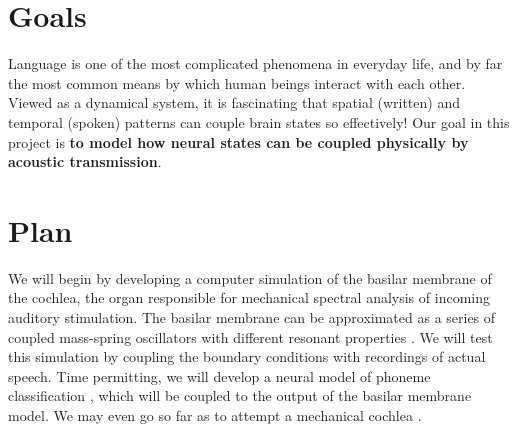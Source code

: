 

\section{Goals}

Language is one of the most complicated phenomena in everyday life, and by far
the most common means by which human beings interact with each other. Viewed as
a dynamical system, it is fascinating that spatial (written) and temporal
(spoken) patterns can couple brain states so effectively! Our goal in this
project is \textbf{to model how neural states can be coupled physically by
acoustic transmission}.

\section{Plan}

We will begin by developing a computer simulation of the basilar membrane
of the cochlea, the organ responsible for mechanical spectral analysis of
incoming auditory stimulation\cite{nilsen99,ruggero97}. The basilar membrane
can be approximated as a series of coupled mass-spring oscillators with
different resonant properties \cite{hubbard06,hubbard96}.  We will test this
simulation by coupling the boundary conditions with recordings of actual
speech. Time permitting, we will develop a neural model of phoneme
classification \cite{mesgarani08}, which will be coupled to the output of the
basilar membrane model. We may even go so far as to attempt a mechanical cochlea
\cite{hubbard06,keolian97}.






